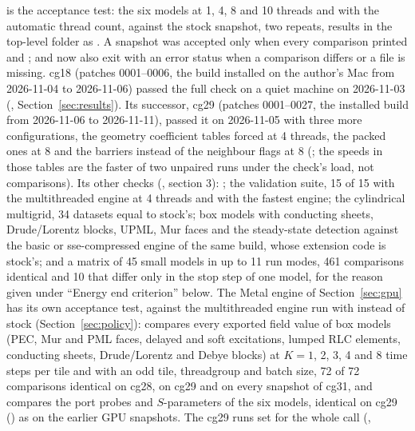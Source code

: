  is the acceptance test: the six models at 1, 4, 8 and 10 threads and with the automatic
thread count, against the stock snapshot, two repeats, results in the top-level  folder as
. A snapshot was accepted only when every comparison printed  and
;  and  now also exit with an error status when a comparison
differs or a file is missing. cg18 (patches 0001--0006, the build installed on the author's Mac from 2026-11-04 to
2026-11-06) passed the full check on a quiet machine on 2026-11-03 (,
Section~\ref{sec:results}). Its successor, cg29 (patches 0001--0027, the installed build from 2026-11-06 to
2026-11-11), passed it on 2026-11-05 with three more configurations, the geometry coefficient tables
forced at 4 threads, the packed ones at 8 and the barriers instead of the neighbour flags at 8
(; the speeds in those tables are the faster of two unpaired runs under the check's load,
not comparisons).
Its other checks (, section 3): ;
the validation suite, 15 of 15 with the multithreaded engine at 4 threads and with the fastest engine; the cylindrical
multigrid, 34 datasets equal to stock's; box models with conducting sheets, Drude/Lorentz blocks, UPML, Mur faces and
the steady-state detection against the basic or sse-compressed engine of the same build, whose extension code is
stock's; and a matrix of 45 small models in up to 11 run modes, 461 comparisons identical and 10 that differ only in
the stop step of one model, for the reason given under ``Energy end criterion'' below. The Metal engine of
Section~\ref{sec:gpu} has its own acceptance test, against the multithreaded engine run with 
instead of stock (Section~\ref{sec:policy}):  compares every exported field
value of box models (PEC, Mur and PML faces, delayed and soft excitations, lumped RLC elements, conducting sheets,
Drude/Lorentz and Debye blocks) at $K=1$, 2, 3, 4 and 8 time steps per tile and with an odd tile, threadgroup and
batch size, 72 of 72 comparisons identical on cg28, on cg29 and on every snapshot of cg31, and 
compares the port probes and
$S$-parameters of the six models, identical on cg29 () as on the earlier GPU snapshots.
The cg29 runs set  for the whole call (,
